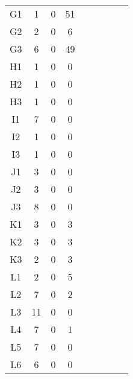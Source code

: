 \begin{center}
\begin{longtable}{ccccc|cccc}
G1    & 1     & 0     & 51 \\
G2    & 2     & 0     & 6 \\
G3    & 6     & 0     & 49 \\
H1    & 1     & 0     & 0 \\
H2    & 1     & 0     & 0 \\
H3    & 1     & 0     & 0 \\
I1    & 7     & 0     & 0 \\
I2    & 1     & 0     & 0 \\
I3    & 1     & 0     & 0 \\
J1    & 3     & 0     & 0 \\
J2    & 3     & 0     & 0 \\
J3    & 8     & 0     & 0 \\
K1    & 3     & 0     & 3 \\
K2    & 3     & 0     & 3 \\
K3    & 2     & 0     & 3 \\
L1    & 2     & 0     & 5 \\
L2    & 7     & 0     & 2 \\
L3    & 11    & 0     & 0 \\
L4    & 7     & 0     & 1 \\
L5    & 7     & 0     & 0 \\
L6    & 6     & 0     & 0 \\

\end{longtable}
\end{center}

